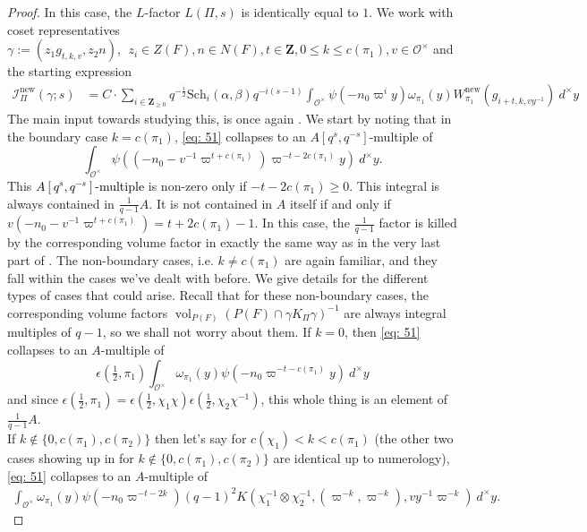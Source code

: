 \documentclass{amsart}
\theoremstyle{plain}
\theoremstyle{plain}
\theoremstyle{remark}
\DeclareMathOperator{\vol}{vol}
\begin{document}
\begin{proof}
    In this case, the $L$-factor $L(\Pi,s)$ is identically equal to $1$. We work with coset representatives 
     $\gamma:=(z_1g_{t,k,v},z_2n),\ \ z_i\in Z(F),n\in N(F),t\in\mathbf{Z}, 0\leq k\leq c(\pi_1), v\in\mathcal{O}^\times$
     and the starting expression 
     \begin{align}\label{eq: 51}
         \mathcal{I}_{\Pi}^\mathrm{new}(\gamma;s)&{=C\cdot \sum_{i\in\mathbf{Z}_{\geq 0}}q^{-\tfrac{i}{2}}\mathrm{Sch}_i(\alpha,\beta)q^{-i(s-1)}\int_{\mathcal{O}^\times}\psi(-n_0\varpi^i y)\omega_{\pi_1}(y) W_{\pi_1}^\mathrm{new}(g_{i+t,k,vy^{-1}})\ d^\times y}
     \end{align}
     The main input towards studying this, is once again \cite[Lemma $3.6$]{Assing_2018}. We start by noting that in the boundary case $k=c(\pi_1)$, \eqref{eq: 51} collapses to an $A[q^s,q^{-s}]$-multiple of
     $$\int_{\mathcal{O}^\times}\psi((-n_0-v^{-1}\varpi^{t+c(\pi_1)})\varpi^{-t-2c(\pi_1)}y)\ d^\times y.$$
     This \textcolor{black}{$A[q^s,q^{-s}]$-multiple} is non-zero only if $-t-2c(\pi_1)\geq 0$. This integral is always contained in $\tfrac{1}{q-1}A$. It is not contained in $A$ itself if and only if $v(-n_0-v^{-1}\varpi^{t+c(\pi_1)})=t+2c(\pi_1)-1$. In this case, the $\tfrac{1}{q-1}$ factor is killed by the corresponding volume factor in exactly the same way as in the very last part of . The non-boundary cases, i.e. $k\neq c(\pi_1)$ are again familiar, and they fall within the cases we've dealt with before. We give details for the different types of cases that could arise. Recall that for these non-boundary cases, the corresponding volume factors $\vol_{P(F)}(P(F)\cap \gamma K_\Pi\gamma)^{-1}$ are always integral multiples of $q-1$, so we shall not worry about them. If $k=0$, then \eqref{eq: 51} collapses to an $A$-multiple of
     $$\epsilon(\tfrac{1}{2},\pi_1)\int_{\mathcal{O}^\times}\omega_{\pi_1}(y)\psi(-n_0\varpi^{-t-c(\pi_1)}y)\ d^\times y$$
     and since $\epsilon(\tfrac{1}{2},\pi_1)=\epsilon(\tfrac{1}{2},\chi_1\chi)\epsilon(\tfrac{1}{2},\chi_2\chi^{-1})$, this whole thing is an element of $\tfrac{1}{q-1}A$.\\
     If $k\notin \{0,c(\pi_1),c(\pi_2)\}$ then let's say for $c(\chi_1)<k<c(\pi_1)$ (the other two cases showing up in \cite[Lemma $3.6$]{Assing_2018} for  $k\notin \{0,c(\pi_1),c(\pi_2)\}$ are identical up to numerology), \eqref{eq: 51} collapses to an $A$-multiple of
     \begin{align}\label{eq: 52}\int_{\mathcal{O}^\times}\omega_{\pi_1}(y)\psi(-n_0\varpi^{-t-2k})(q-1)^2K(\chi_1^{-1}\otimes \chi_2^{-1},(\varpi^{-k},\varpi^{-k}),vy^{-1}\varpi^{-k})\ d^\times y.\end{align}

\end{proof}
\end{document}
